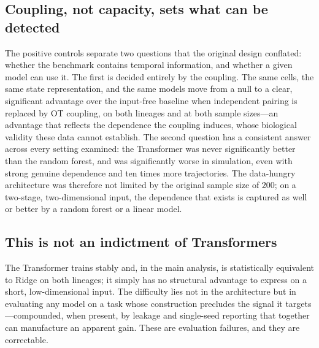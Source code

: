 \documentclass[10pt,letterpaper]{article}
\begin{document}
\subsection*{Coupling, not capacity, sets what can be detected}
The positive controls separate two questions that the original design conflated: whether the benchmark contains temporal information, and whether a given model can use it. The first is decided entirely by the coupling. The same cells, the same state representation, and the same models move from a null to a clear, significant advantage over the input-free baseline when independent pairing is replaced by OT coupling, on both lineages and at both sample sizes---an advantage that reflects the dependence the coupling induces, whose biological validity these data cannot establish. The second question has a consistent answer across every setting examined: the Transformer was never significantly better than the random forest, and was significantly worse in simulation, even with strong genuine dependence and ten times more trajectories. The data-hungry architecture was therefore not limited by the original sample size of $200$; on a two-stage, two-dimensional input, the dependence that exists is captured as well or better by a random forest or a linear model.

\subsection*{This is not an indictment of Transformers}
The Transformer trains stably and, in the main analysis, is statistically equivalent to Ridge on both lineages; it simply has no structural advantage to express on a short, low-dimensional input. The difficulty lies not in the architecture but in evaluating any model on a task whose construction precludes the signal it targets---compounded, when present, by leakage and single-seed reporting that together can manufacture an apparent gain. These are evaluation failures, and they are correctable.
\end{document}

